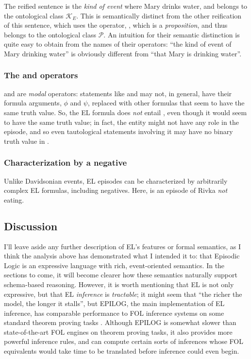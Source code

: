 The reified sentence  is the \textit{kind of event} where Mary drinks water, and belongs to the ontological class $\mathcal{K}_{E}$. This is semantically distinct from the other reification of this sentence, which uses the  operator, , which is a \textit{proposition}, and thus belongs to the ontological class $\mathcal{P}$. An intuition for their semantic distinction is quite easy to obtain from the names of their operators: ``the kind of event of Mary drinking water'' is obviously different from ``that Mary is drinking water''.

\subsubsection{The \el{**} and \el{*} operators}
\el{**} and \el{*} are \textit{modal} operators: statements like \el{[$\phi$ ** e]} and \el{[$\psi$ * e]} may not, in general, have their formula arguments, $\phi$ and $\psi$, replaced with other formulas that seem to have the same truth value. So, the EL formula  does \textit{not} entail , even though it would seem to have the same truth value; in fact, the entity  might not have any role in the episode, and so even tautological statements involving it may have no binary truth value in .

\subsubsection{Characterization by a negative}
Unlike Davidsonian events, EL episodes can be characterized by arbitrarily complex EL formulas, including negatives. Here,  is an episode of Rivka \textit{not} eating.

\subsection{Discussion}
I'll leave aside any further description of EL's features or formal semantics, as I think the analysis above has demonstrated what I intended it to: that Episodic Logic is an expressive language with rich, event-oriented semantics. In the sections to come, it will become clearer how these semantics naturally support schema-based reasoning. However, it is worth mentioning that EL is not only expressive, but that EL \textit{inference} is \textit{tractable}; it might seem that ``the richer the model, the longer it stalls'', but EPILOG, the main implementation of EL inference, has comparable performance to FOL inference systems on some standard theorem proving tasks \citep{morbini2009evaluation}. Although EPILOG is somewhat slower than state-of-the-art FOL engines on theorem proving tasks, it also provides more powerful inference rules, and can compute certain sorts of inferences whose FOL equivalents would take time to be translated before inference could even begin.

